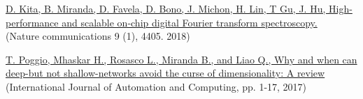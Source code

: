 \documentclass{article}
\newenvironment{changemargin}[2]{%
  \begin{list}{}{%
    \setlength{\topsep}{0pt}%
    \setlength{\leftmargin}{#1}%
    \setlength{\rightmargin}{#2}%
    \setlength{\listparindent}{\parindent}%
    \setlength{\itemindent}{\parindent}%
    \setlength{\parsep}{\parskip}%
  }%
  \item[]}{\end{list}
}
\newenvironment{body} {
	\vspace*{-16pt}
	\begin{changemargin}{-0.25in}{-0.5in}
  }	
	{\end{changemargin}
}
\begin{document}
\begin{body}
    
    
    \vspace{10pt}
    \href{https://www.nature.com/articles/s41467-018-06773-2}{D. Kita, B. Miranda, D. Favela, D. Bono, J. Michon, H. Lin, T Gu, J. Hu, High-performance and scalable on-chip digital Fourier transform spectroscopy.}
    \\
    (Nature communications 9 (1), 4405. 2018)
    
    
    
    \vspace{12pt}
    \href{https://link.springer.com/article/10.1007/s11633-017-1054-2}{T. Poggio, Mhaskar H., Rosasco L., Miranda B., and Liao Q., Why and when can deep-but not shallow-networks avoid the curse of dimensionality: A review}
    \\
    (International Journal of Automation and Computing, pp. 1-17, 2017)
    
    

\end{body}
\end{document}
